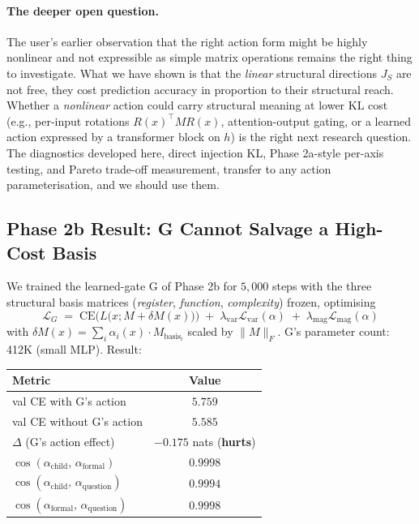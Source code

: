 \documentclass[11pt, a4paper]{article}
\theoremstyle{plain}
\theoremstyle{definition}
\theoremstyle{remark}
\begin{document}
\paragraph{The deeper open question.}
The user's earlier observation that the right action form might be highly nonlinear and not expressible as simple matrix operations remains the right thing to investigate.
What we have shown is that the \emph{linear} structural directions $J_S$ are not free, they cost prediction accuracy in proportion to their structural reach.
Whether a \emph{nonlinear} action could carry structural meaning at lower KL cost (e.g., per-input rotations $R(x)^{\!\top} M R(x)$, attention-output gating, or a learned action expressed by a transformer block on $h$) is the right next research question.
The diagnostics developed here, direct injection KL, Phase 2a-style per-axis testing, and Pareto trade-off measurement, transfer to any action parameterisation, and we should use them.

\subsection{Phase 2b Result: G Cannot Salvage a High-Cost Basis}
\label{sec:phase2b}

We trained the learned-gate G of Phase 2b for $5{,}000$ steps with the three structural basis matrices (\textit{register}, \textit{function}, \textit{complexity}) frozen, optimising
\[
\mathcal{L}_G \;=\; \mathrm{CE}\big(L\big(x; M + \delta M(x)\big)\big) \;+\; \lambda_{\text{var}} \mathcal{L}_{\text{var}}(\alpha) \;+\; \lambda_{\text{mag}} \mathcal{L}_{\text{mag}}(\alpha)
\]
with $\delta M(x) = \sum_i \alpha_i(x) \cdot M_{\text{basis}_i}$ scaled by $\|M\|_F$.
G's parameter count: 412K (small MLP).
Result:

\begin{center}
\begin{tabular}{l c}
\toprule
Metric & Value \\
\midrule
val CE with G's action       & $5.759$ \\
val CE without G's action    & $5.585$ \\
$\Delta$ (G's action effect) & $-0.175$ nats (\textbf{hurts}) \\
\midrule
$\cos(\alpha_{\text{child}},\,\alpha_{\text{formal}})$    & $0.9998$ \\
$\cos(\alpha_{\text{child}},\,\alpha_{\text{question}})$  & $0.9994$ \\
$\cos(\alpha_{\text{formal}},\,\alpha_{\text{question}})$ & $0.9998$ \\
\bottomrule
\end{tabular}
\end{center}
\end{document}
